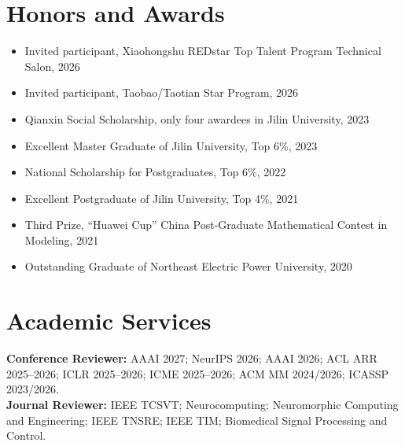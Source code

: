 \documentclass[10pt,a4paper]{article}
\newcommand{\service}[2]{\textbf{#1:} #2}
\begin{document}
\section*{Honors and Awards}
\begin{itemize}
  \item Invited participant, Xiaohongshu REDstar Top Talent Program Technical Salon, 2026
  \item Invited participant, Taobao/Taotian Star Program, 2026
  \item Qianxin Social Scholarship, only four awardees in Jilin University, 2023
  \item Excellent Master Graduate of Jilin University, Top 6\%, 2023
  \item National Scholarship for Postgraduates, Top 6\%, 2022
  \item Excellent Postgraduate of Jilin University, Top 4\%, 2021
  \item Third Prize, ``Huawei Cup'' China Post-Graduate Mathematical Contest in Modeling, 2021
  \item Outstanding Graduate of Northeast Electric Power University, 2020
\end{itemize}

\section*{Academic Services}
\service{Conference Reviewer}{AAAI 2027; NeurIPS 2026; AAAI 2026; ACL ARR 2025--2026; ICLR 2025--2026; ICME 2025--2026; ACM MM 2024/2026; ICASSP 2023/2026.}\\
\service{Journal Reviewer}{IEEE TCSVT; Neurocomputing; Neuromorphic Computing and Engineering; IEEE TNSRE; IEEE TIM; Biomedical Signal Processing and Control.}
\end{document}
